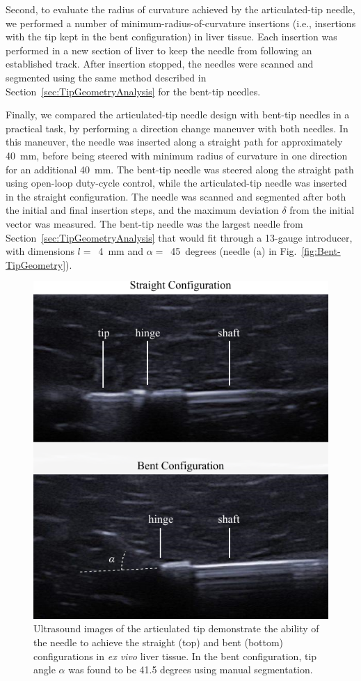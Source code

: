 Second, to evaluate the radius of curvature achieved by the articulated-tip needle, we performed a number of minimum-radius-of-curvature insertions (i.e., insertions with the tip kept in the bent configuration) in liver tissue. Each insertion was performed in a new section of liver to keep the needle from following an established track. After insertion stopped, the needles were scanned and segmented using the same method described in Section~\ref{sec:TipGeometryAnalysis} for the bent-tip needles.

Finally, we compared the articulated-tip needle design with bent-tip needles in a practical task, by performing a direction change maneuver with both needles. In this maneuver, the needle was inserted along a straight path for approximately 40~mm, before being steered with minimum radius of curvature in one direction for an additional 40~mm. The bent-tip needle was steered along the straight path using open-loop duty-cycle control, while the articulated-tip needle was inserted in the straight configuration. The needle was scanned and segmented after both the initial and final insertion steps, and the maximum deviation $\delta$ from the initial vector was measured. The bent-tip needle was the largest needle from Section~\ref{sec:TipGeometryAnalysis} that would fit through a 13-gauge introducer, with dimensions $l =$~4~mm and $\alpha =$~45~degrees (needle (a) in Fig.~\ref{fig:Bent-TipGeometry}).  

\begin{figure}[!t]
\centering
\includegraphics[width = 0.75\columnwidth]{Images/Chapter3/ArticulatedTipUS/ArticulatedTipUS}%
\caption[Ultrasound images of the articulated tip]{Ultrasound images of the articulated tip demonstrate the ability of the needle to achieve the straight (top) and bent (bottom) configurations in \textit{ex vivo} liver tissue. In the bent configuration, tip angle $\alpha$ was found to be 41.5 degrees using manual segmentation.}
\label{fig:ArticulatedTipUS}
\end{figure}

